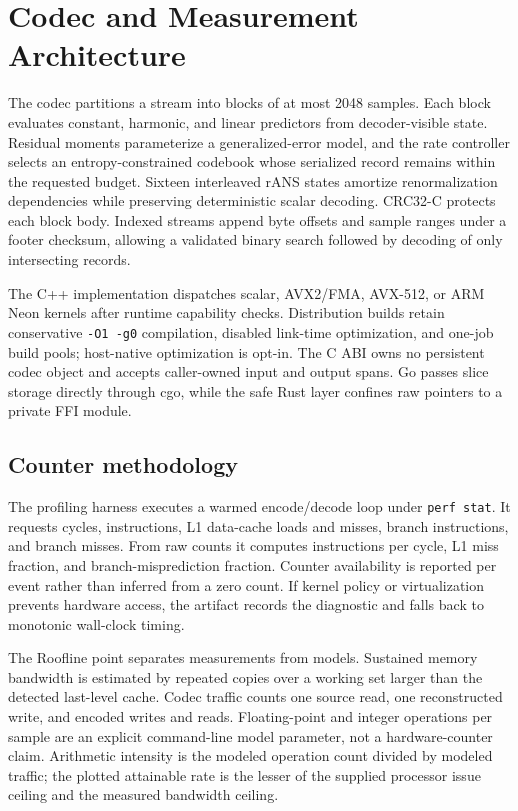 \section{Codec and Measurement Architecture}
The codec partitions a stream into blocks of at most 2048 samples. Each block evaluates constant, harmonic, and linear predictors from decoder-visible state. Residual moments parameterize a generalized-error model, and the rate controller selects an entropy-constrained codebook whose serialized record remains within the requested budget. Sixteen interleaved rANS states amortize renormalization dependencies while preserving deterministic scalar decoding. CRC32-C protects each block body. Indexed streams append byte offsets and sample ranges under a footer checksum, allowing a validated binary search followed by decoding of only intersecting records.

The C++ implementation dispatches scalar, AVX2/FMA, AVX-512, or ARM Neon kernels after runtime capability checks. Distribution builds retain conservative \texttt{-O1 -g0} compilation, disabled link-time optimization, and one-job build pools; host-native optimization is opt-in. The C ABI owns no persistent codec object and accepts caller-owned input and output spans. Go passes slice storage directly through cgo, while the safe Rust layer confines raw pointers to a private FFI module.

\subsection{Counter methodology}
The profiling harness executes a warmed encode/decode loop under \texttt{perf stat}. It requests cycles, instructions, L1 data-cache loads and misses, branch instructions, and branch misses. From raw counts it computes instructions per cycle, L1 miss fraction, and branch-misprediction fraction. Counter availability is reported per event rather than inferred from a zero count. If kernel policy or virtualization prevents hardware access, the artifact records the diagnostic and falls back to monotonic wall-clock timing.

The Roofline point separates measurements from models. Sustained memory bandwidth is estimated by repeated copies over a working set larger than the detected last-level cache. Codec traffic counts one source read, one reconstructed write, and encoded writes and reads. Floating-point and integer operations per sample are an explicit command-line model parameter, not a hardware-counter claim. Arithmetic intensity is the modeled operation count divided by modeled traffic; the plotted attainable rate is the lesser of the supplied processor issue ceiling and the measured bandwidth ceiling.
